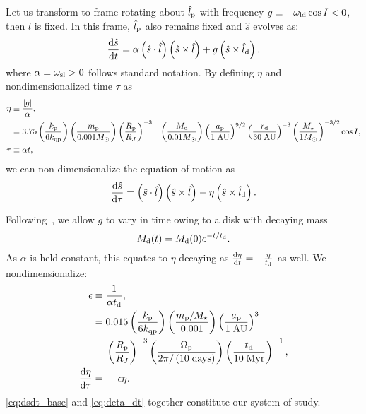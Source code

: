 \documentclass[
        fleqn,
        usenatbib,
        referee,
    ]{mnras}
\newcommand*{\rd}[2]{\frac{\mathrm{d}#1}{\mathrm{d}#2}}
\newcommand*{\abs}[1]{\left|#1\right|}
\newcommand*{\p}[1]{\left(#1\right)}
\begin{document}
Let us transform to frame rotating about $\hat{l}_{\rm p}$ with frequency $g
\equiv -\omega_{\rm ld}\cos I < 0$, then $\hat{l}$ is fixed. In this frame,
$\hat{l}_{\rm p}$ also remains fixed and $\hat{s}$ evolves as:
\begin{equation}
    \rd{\hat{s}}{t} = \alpha \p{\hat{s} \cdot \hat{l}}
            \p{\hat{s} \times \hat{l}}
        + g\p{\hat{s} \times \hat{l}_{\rm d}},
\end{equation}
where $\alpha \equiv \omega_{\rm sl} > 0$ follows standard notation. By defining
$\eta$ and nondimensionalized time $\tau$ as
\begin{align}
    \eta \equiv{}& \frac{\abs{g}}{\alpha}\label{eq:eta},\\
        ={}& 3.75 \p{\frac{k_{\rm p}}{6k_{\rm qp}}}
            \p{\frac{m_{\rm p}}{0.001 M_\odot}}
            \p{\frac{R_{\rm p}}{R_J}}^{-3}
        &\p{\frac{M_{\rm d}}{0.01 M_{\odot}}}
            \p{\frac{a_{\rm p}}{1\;\mathrm{AU}}}^{9/2}
            \p{\frac{r_{\rm d}}{30 \;\mathrm{AU}}}^{-3}
            \p{\frac{M_\star}{1M_{\odot}}}^{-3/2}
            \cos I,\\
    \tau \equiv{}& \alpha t,
\end{align}
we can non-dimensionalize the equation of motion as
\begin{equation}
    \rd{\hat{s}}{\tau} = \p{\hat{s} \cdot \hat{l}}
            \p{\hat{s} \times \hat{l}}
        - \eta\p{\hat{s} \times \hat{l}_{\rm d}}. \label{eq:dsdt_base}
\end{equation}

Following~\cite{millholland_disk}, we allow $g$ to vary in time owing to a
disk with decaying mass
\begin{equation}
    M_{\rm d}(t) = M_{\rm d}(0)e^{-t/t_{\rm d}}.
\end{equation}
As $\alpha$ is held constant, this equates to $\eta$ decaying as $\rd{\eta}{t} =
-\frac{\eta}{t_{\rm d}}$ as well. We nondimensionalize:
\begin{align}
    \epsilon \equiv{}& \frac{1}{\alpha t_{\rm d}},\\
        ={}& 0.015 \p{\frac{k_{\rm p}}{6k_{\rm qp}}}
            \p{\frac{m_{\rm p}/M_\star}{0.001}}
            \p{\frac{a_{\rm p}}{1\;\mathrm{AU}}}^3\nonumber\\
        &\p{\frac{R_{\rm p}}{R_J}}^{-3}
            \p{\frac{\Omega_{\rm p}}{2\pi/\p{10\;\mathrm{days}}}}
            \p{\frac{t_{\rm d}}{10\;\mathrm{Myr}}}^{-1},\\
    \rd{\eta}{\tau} ={}& -\epsilon \eta.\label{eq:deta_dt}
\end{align}
\autoref{eq:dsdt_base} and \autoref{eq:deta_dt} together constitute our system
of study.
\end{document}
